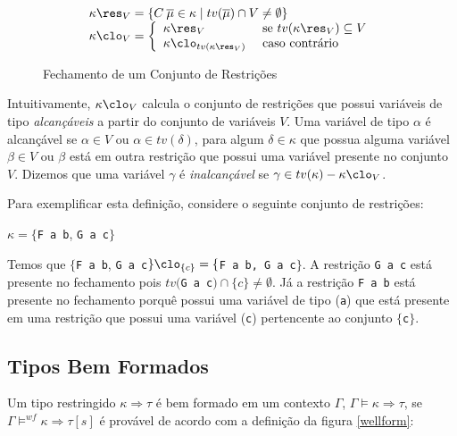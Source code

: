 \begin{figure}[h]
\[ \begin{array}{l} 
        \kappa \res_V = \{ C\:\overline{\mu} \in \kappa \mid tv(\overline{\mu}) \cap V \not= \emptyset \} \\
        \kappa \clo_V = \left\{ \begin{array}{ll} 
             \kappa\res_V & \text{ se $tv(\kappa\res_V) \subseteq V$}\\ 
             \kappa\clo_{tv(\kappa\res_V)} & \text{ caso contr\'ario}
                                 \end{array} \right.  
      \end{array} \]
      \caption{Fechamento de um Conjunto de Restri\c{c}\~oes}
      \label{figclosure}
\end{figure}
Intuitivamente, $\kappa\clo_{V}$ calcula o conjunto de restri\c{c}\~oes que possui vari\'aveis de tipo 
\emph{alcan\c{c}\'aveis} a partir do conjunto de vari\'aveis $V$. Uma vari\'avel de tipo $\alpha$ \'e alcan\c{c}\'avel 
se $\alpha\in V$ ou $\alpha\in tv(\delta)$, para algum $\delta\in\kappa$ que possua alguma vari\'avel $\beta\in V$ ou
$\beta$ est\'a em outra restri\c{c}\~ao que possui uma vari\'avel presente no conjunto $V$. Dizemos que uma vari\'avel
$\gamma$ \'e \emph{inalcan\c{c}\'avel} se $\gamma\in tv(\kappa)-\kappa\clo_{V}$.

Para exemplificar esta defini\c{c}\~ao, considere o seguinte conjunto de restri\c{c}\~oes: 
\begin{center}
	$\kappa=\{$\texttt{F a b}, \texttt{G a c}$\}$
\end{center}
Temos que $\{$\texttt{F a b}, \texttt{G a c}$\}\clo_{\{c\}}=\{$\texttt{F a b, G a c}$\}$. A restri\c{c}\~ao 
\texttt{G a c} est\'a presente no fechamento pois $tv($\texttt{G a c}$)\cap\{c\}\neq\emptyset$.  J\'a a restri\c{c}\~ao
\texttt{F a b} est\'a presente no fechamento porqu\^e possui uma vari\'avel de tipo (\texttt{a}) que est\'a presente em
uma restri\c{c}\~ao que possui uma vari\'avel (\texttt{c}) pertencente ao conjunto $\{$\texttt{c}$\}$.
 
\subsection{Tipos Bem Formados} \label{wellformedty}

Um tipo restringido $\kappa\Rightarrow\tau$ \'e bem formado em um contexto $\Gamma$, 
$\Gamma\models\kappa\Rightarrow\tau$, se $\Gamma\models^{wf}\kappa\Rightarrow\tau[s]$ \'e prov\'avel de acordo 
com a defini\c{c}\~ao da figura \ref{wellform}:

